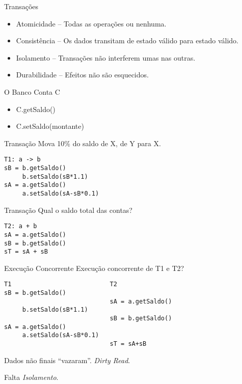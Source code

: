 \begin{frame}{Transações}
\begin{itemize}
	\item \alert{Atomicidade} -- Todas as operações ou nenhuma.
	\item Consistência -- Os dados transitam de estado válido para estado válido.
	\item Isolamento -- Transações não interferem umas nas outras.
	\item \alert{Durabilidade} -- Efeitos não são esquecidos.
\end{itemize}
\end{frame}

\begin{frame}{O Banco}
Conta C
\begin{itemize}
	\item C.\alert{get}Saldo()
	\item C.\alert{set}Saldo(montante)
\end{itemize}
\end{frame}

\begin{frame}[fragile]{Transação}
Mova 10\% do saldo de X, de Y para X.
\begin{verbatim}
T1: a -> b
sB = b.getSaldo()
     b.setSaldo(sB*1.1)
sA = a.getSaldo()                          
     a.setSaldo(sA-sB*0.1)
\end{verbatim}
\end{frame}

\begin{frame}[fragile]{Transação}
Qual o saldo total das contas?
\begin{verbatim}
T2: a + b
sA = a.getSaldo()
sB = b.getSaldo()
sT = sA + sB
\end{verbatim}
\end{frame}


\begin{frame}[fragile]{Execução Concorrente}
Execução concorrente de T1 e T2?
\begin{verbatim}
T1                           T2
sB = b.getSaldo()
                             sA = a.getSaldo()
     b.setSaldo(sB*1.1)
                             sB = b.getSaldo()
sA = a.getSaldo()                          
     a.setSaldo(sA-sB*0.1)
                             sT = sA+sB
\end{verbatim}

\pause Dados não finais ``vazaram''. \emph{Dirty Read}. 

\pause Falta \emph{Isolamento}.
\end{frame}

